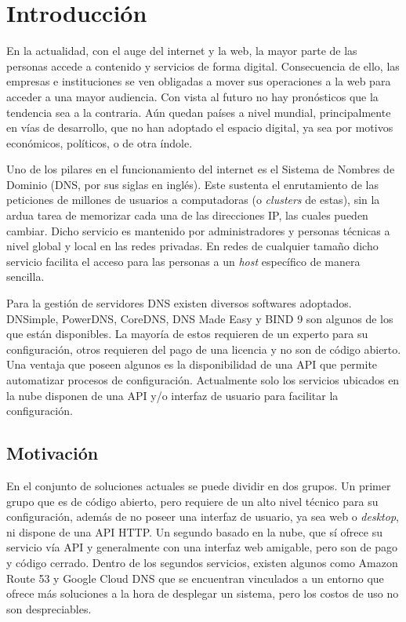 \chapter{Introducción}\label{chapter:introduction}

En la actualidad, con el auge del internet y la web, la mayor parte de las personas accede a contenido y servicios de forma digital. Consecuencia de ello, las empresas e instituciones se ven obligadas a mover sus operaciones a la web para acceder a una mayor audiencia. Con vista al futuro no hay pronósticos que la tendencia sea a la contraria. Aún quedan países a nivel mundial, principalmente en vías de desarrollo, que no han adoptado el espacio digital, ya sea por motivos económicos, políticos, o de otra índole.

Uno de los pilares en el funcionamiento del internet es el Sistema de Nombres de Dominio (DNS, por sus siglas en inglés). Este sustenta el enrutamiento de las peticiones de millones de usuarios a computadoras (o \textit{clusters} de estas), sin la ardua tarea de memorizar cada una de las direcciones IP, las cuales pueden cambiar. Dicho servicio es mantenido por administradores y personas técnicas a nivel global y local en las redes privadas. En redes de cualquier tamaño dicho servicio facilita el acceso para las personas a un \textit{host} específico de manera sencilla.

Para la gestión de servidores DNS existen diversos softwares adoptados. DNSimple, PowerDNS, CoreDNS, DNS Made Easy y BIND 9 son algunos de los que están disponibles. La mayoría de estos requieren de un experto para su configuración, otros requieren del pago de una licencia y no son de código abierto. Una ventaja que poseen algunos es la disponibilidad de una API que permite automatizar procesos de configuración. Actualmente solo los servicios ubicados en la nube disponen de una API y/o interfaz de usuario para facilitar la configuración.

\section{Motivación}

En el conjunto de soluciones actuales se puede dividir en dos grupos. Un primer grupo que es de código abierto, pero requiere de un alto nivel técnico para su configuración, además de no poseer una interfaz de usuario, ya sea web o \textit{desktop}, ni dispone de una API HTTP. Un segundo basado en la nube, que sí ofrece su servicio vía API y generalmente con una interfaz web amigable, pero son de pago y código cerrado. Dentro de los segundos servicios, existen algunos como Amazon Route 53 y Google Cloud DNS que se encuentran vinculados a un entorno que ofrece más soluciones a la hora de desplegar un sistema, pero los costos de uso no son despreciables.

